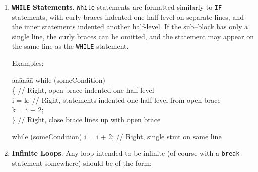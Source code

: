 \documentclass[11pt]{article}
\begin{document}
\begin{enumerate}
Example:

\begin{tt}
\begin{tabbing}
aa\=aa\=aa\= \kill
for (int i = 0; i < MAX\_COUNT; ++i) \\
\>\{             // Curly brace indented one-half level \\
\>\>sum += i;    // Statements indented another one-half level \\
\>\>prod *= i;                                          \\
\>\}             // Close brace on same column as open brace \\
\end{tabbing}
\end{tt}

\begin{tt}
for (int i = 0; i < MAX\_COUNT; ++i) Sub1(i); // Right, single statement\\
\end{tt}

\item {\bf {\tt WHILE} Statements}.
{\tt While} statements are formatted similarly to {\tt IF} statements,
with curly braces indented one-half level on separate lines, and the
inner statements indented another half-level. If the sub--block has only
a single line, the curly braces can be omitted, and the statement may
appear on the same line as the {\tt WHILE} statement.

Examples:

\begin{tt}
\begin{tabbing}
aa\=aa\=aa\= \kill
while (someCondition) \\
\>\{ // Right, open brace indented one-half level \\
\>\>i = k; // Right, statements indented one-half level from open brace \\
\>\>k = i + 2;\\
\>\}       // Right, close brace lines up with open brace
\end{tabbing}
\end{tt}

\begin{tt}
while (someCondition) i = i + 2; // Right, single stmt on same line
\end{tt}

\item {\bf Infinite Loops}.
Any loop intended to be infinite (of course with a {\tt break} statement
somewhere) should be of the form:


\end{enumerate}
\end{document}

